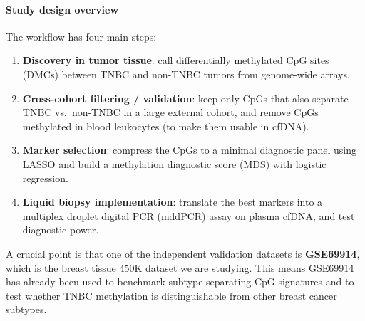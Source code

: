 \documentclass[10pt]{extarticle}
\begin{document}
\paragraph{Study design overview}
The workflow has four main steps:
\begin{enumerate}
    \item \textbf{Discovery in tumor tissue}: call differentially methylated CpG sites (DMCs) between TNBC and non-TNBC tumors from genome-wide arrays.
    \item \textbf{Cross-cohort filtering / validation}: keep only CpGs that also separate TNBC vs.\ non-TNBC in a large external cohort, and remove CpGs methylated in blood leukocytes (to make them usable in cfDNA).
    \item \textbf{Marker selection}: compress the CpGs to a minimal diagnostic panel using LASSO and build a methylation diagnostic score (MDS) with logistic regression.
    \item \textbf{Liquid biopsy implementation}: translate the best markers into a multiplex droplet digital PCR (mddPCR) assay on plasma cfDNA, and test diagnostic power. 
\end{enumerate}

A crucial point is that one of the independent validation datasets is \textbf{GSE69914}, which is the breast tissue 450K dataset we are studying. This means GSE69914 has already been used to benchmark subtype-separating CpG signatures and to test whether TNBC methylation is distinguishable from other breast cancer subtypes. 
\end{document}
